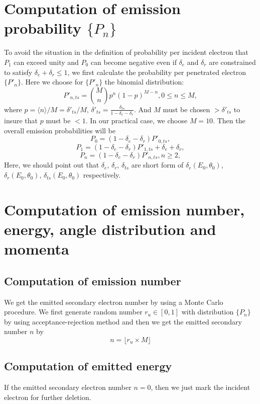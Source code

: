 \documentclass[a4paper,11pt]{article}
\begin{document}
\section{Computation of emission probability $\{P_n\}$}
To avoid the situation in the definition of probability per incident electron that $P_1$ can exceed unity and $P_0$ can become negative even if $\delta_e$ and $\delta_r$ are constrained to satisfy $\delta_e+\delta_r \leq 1$, we first calculate the probability per penetrated electron $\{P'_n\}$. Here we choose for $\{P'_n\}$ the binomial distribution:
\begin{equation*}
P'_{n,ts} = \binom{M}{n}p^n(1-p)^{M-n}, 0 \leq n \leq M,
\end{equation*}
where $p = \langle n \rangle /M = \delta'_{ts}/M$, $\delta'_{ts} = \frac{\delta_{ts}}{1 - \delta_{e} - \delta_{r}}$. And $M$ must be chosen $> \delta'_{ts}$ to insure that $p$ must be $< 1$. In our practical case, we choose $M = 10$. Then the overall emission probabilities will be
\begin{equation*}
P_0 = (1 - \delta_e - \delta_r)P'_{0,ts},
\end{equation*}
\begin{equation*}
P_1 = (1 - \delta_e - \delta_r)P'_{1,ts} + \delta_e + \delta_r,
\end{equation*}
\begin{equation*}
P_n = (1 - \delta_e - \delta_r)P'_{n,ts}, n \geq 2,
\end{equation*}
Here, we should point out that $\delta_e$, $\delta_r$, $\delta_{ts}$ are short form of $\delta_e(E_0,\theta_0)$, $\delta_r(E_0,\theta_0)$, $\delta_{ts}(E_0,\theta_0)$ respectively.
\section{Computation of emission number, energy, angle distribution and momenta}
\subsection{Computation of emission number}
We get the emitted secondary electron number by using a Monte Carlo procedure. We first generate random number $r_u \in [0,1]$ with distribution $\{P_n\}$ by using acceptance-rejection method and then we get the emitted secondary number $n$ by
\begin{equation*}
n = \lfloor r_u \times M \rfloor
\end{equation*} 
\subsection{Computation of emitted energy}
If the emitted secondary electron number $n = 0$, then we just mark the incident electron for further deletion.\\
\end{document}
